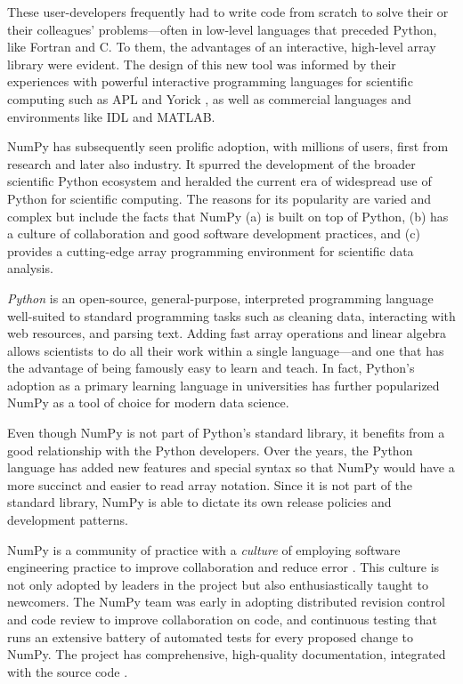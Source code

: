 These user-developers frequently had to write code from scratch to solve
their or their colleagues' problems---often in low-level languages
that preceded Python, like Fortran \cite{dongarra2008netlib} and C.
To them, the advantages of an interactive, high-level array library
were evident. The design of this new tool was informed by their
experiences with powerful interactive programming languages for
scientific computing such as APL \cite{iverson1962programming} and
Yorick \cite{munro1995using}, as well as commercial languages and
environments like IDL and {MATLAB}.

NumPy has subsequently seen prolific adoption, with millions of users,
first from research and later also industry.
It spurred the development of the broader scientific Python ecosystem and
heralded the current era of widespread use of Python for scientific computing.
The reasons for its popularity are varied and complex but include the facts that
NumPy (a) is built on top of Python,
(b) has a culture of collaboration and good software development practices, and
(c) provides a cutting-edge array programming environment for scientific data analysis.

\emph{Python} is an open-source, general-purpose, interpreted programming language
well-suited to standard programming tasks such as cleaning data,
interacting with web resources, and parsing text.
Adding fast array operations and linear algebra allows scientists to do all
their work within a single language---and one that has the advantage of
being famously easy to learn and teach.
In fact, Python's adoption as a primary learning language in universities
has further popularized NumPy as a tool of choice for modern data science.

Even though NumPy is not part of Python's standard library,
it benefits from a good relationship with the Python developers.
Over the years, the Python language has added new features and
special syntax so that NumPy would have a more succinct and 
easier to read array notation.
Since it is not part of the standard library, NumPy is able to
dictate its own release policies and development patterns.

NumPy is a community of practice with a \emph{culture} of
employing software engineering practice to improve collaboration and
reduce error \cite{millman2014developing}.  This culture is not only
adopted by leaders in the project but also enthusiastically taught to
newcomers. The NumPy team was early in adopting distributed revision
control and code review to improve collaboration on code, and
continuous testing that runs an extensive battery of automated tests for
every proposed change to NumPy.  The project has comprehensive,
high-quality documentation, integrated with the source
code \cite{vanderwalt2008scipy,harrington2008scipy,harrington2009scipy}.

